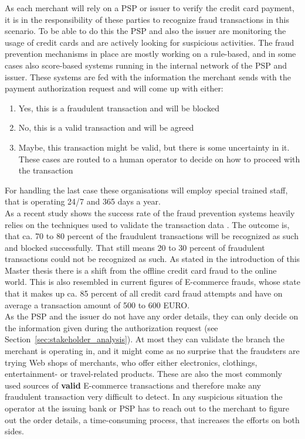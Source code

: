 As each merchant will rely on a \gls{PSP} or issuer to verify the credit card payment, it is in the responsibility of these parties to recognize fraud transactions in this scenario. To be able to do this the \gls{PSP} and also the issuer are monitoring the usage of credit cards and are actively looking for suspicious activities. The fraud prevention mechanisms in place are mostly working on a rule-based, and in some cases also score-based systems running in the internal network of the \gls{PSP} and issuer. These systems are fed with the information the merchant sends with the payment authorization request and will come up with either:\@

\begin{enumerate}
  \item Yes, this is a fraudulent transaction and will be blocked
  \item No, this is a valid transaction and will be agreed
  \item Maybe, this transaction might be valid, but there is some uncertainty in it. These cases are routed to a human operator to decide on how to proceed with the transaction
\end{enumerate}

For handling the last case these organisations will employ special trained staff, that is operating 24/7 and 365 days a year. \\

As a recent study shows the success rate of the fraud prevention systems heavily relies on the techniques used to validate the transaction data \citep{rana2015survey}. The outcome is, that ca. 70 to 80 percent of the fraudulent transactions will be recognized as such and blocked successfully. That still means 20 to 30 percent of fraudulent transactions could not be recognized as such. As stated in the introduction of this Master thesis there is a shift from the offline credit card fraud to the online world. This is also resembled in current figures of E-commerce frauds, whose state that it makes up ca. 85 percent of all credit card fraud attempts and have on average a transaction amount of 500 to 600 EURO.\\

As the \gls{PSP} and the issuer do not have any order details, they can only decide on the information given during the authorization request (see Section~\ref{sec:stakeholder_analysis}). At most they can validate the branch the merchant is operating in, and it might come as no surprise that the fraudsters are trying Web shops of merchants, who offer either electronics, clothings, entertainment- or travel-related products. These are also the most commonly used sources of \textbf{valid} E-commerce transactions and therefore make any fraudulent transaction very difficult to detect. In any suspicious situation the operator at the issuing bank or \gls{PSP} has to reach out to the merchant to figure out the order details, a time-consuming process, that increases the efforts on both sides. \\

